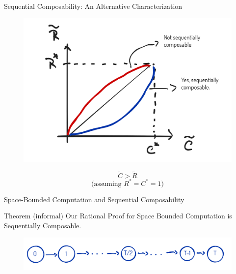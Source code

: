 \begin{frame}{Sequential Composability: An Alternative Characterization}
\begin{figure}
	\includegraphics[scale=0.26]{pics/sc-char.png}
\end{figure}
$$ \tilde{C} > \tilde{R}$$
$$ \text{(assuming } R^* = C^* = 1)$$
\end{frame}

\begin{frame}{Space-Bounded Computation and Sequential Composability}
\begin{block}{Theorem (informal)}
	Our Rational Proof for Space Bounded Computation is Sequentially Composable.
\end{block}
\bigskip
\begin{figure}
	\includegraphics[scale=0.3]{pics/space-protocol.png}
\end{figure}
\end{frame}

